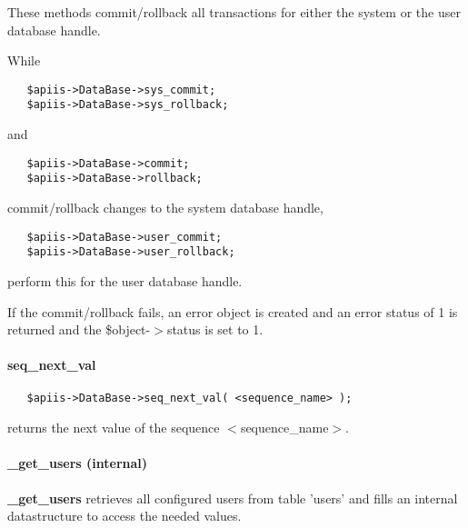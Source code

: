 These methods commit/rollback all transactions for either the system
or the user database handle.



While

\begin{verbatim}
   $apiis->DataBase->sys_commit;
   $apiis->DataBase->sys_rollback;
\end{verbatim}


and

\begin{verbatim}
   $apiis->DataBase->commit;
   $apiis->DataBase->rollback;
\end{verbatim}


commit/rollback changes to the system database handle,

\begin{verbatim}
   $apiis->DataBase->user_commit;
   $apiis->DataBase->user_rollback;
\end{verbatim}


perform this for the user database handle.



If the commit/rollback fails, an error object is created and an error status
of 1 is returned and the \$object-$>$status is set to 1.

\paragraph*{seq\_next\_val\label{Apiis::DataBase::Init_--_Basic_database_initialisation_seq_next_val}}
\begin{verbatim}
   $apiis->DataBase->seq_next_val( <sequence_name> );
\end{verbatim}


returns the next value of the sequence $<$sequence\_name$>$.

\paragraph*{\_get\_users (internal)\label{Apiis::DataBase::Init_--_Basic_database_initialisation__get_users_internal_}}


\textbf{\_get\_users} retrieves all configured users from table 'users' and fills
an internal datastructure to access the needed values.



